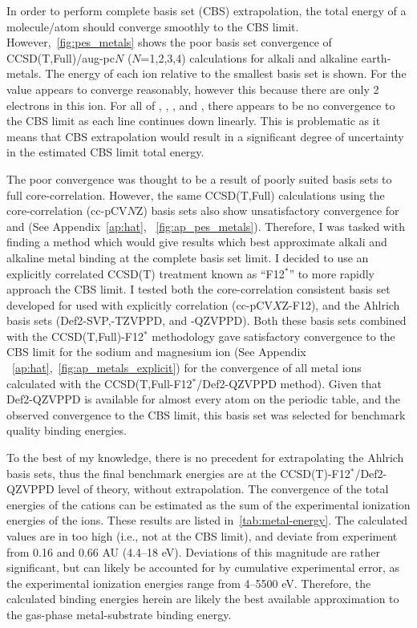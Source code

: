 In order to perform complete basis set (CBS) extrapolation, the total energy of a molecule/atom should converge smoothly to the CBS limit.\cite{Truhlar1998} However,~\ref{fig:pes_metals} shows the poor basis set convergence of CCSD(T,Full)/aug-pc$N$ ($N$=1,2,3,4) calculations for alkali and alkaline earth-metals. The energy of each ion relative to the smallest basis set is shown. For  the value appears to converge reasonably, however this because there are only 2 electrons in this ion. For all of , , , and , there appears to be no convergence to the CBS limit as each line continues down linearly. This is problematic as it means that CBS extrapolation would result in a significant degree of uncertainty in the estimated CBS limit total energy.

The poor convergence was thought to be a result of poorly suited basis sets to full core-correlation. However, the same CCSD(T,Full) calculations using the core-correlation (cc-pCV$N$Z) basis sets also show unsatisfactory convergence for  and  (See Appendix~\ref{ap:hat}, ~\ref{fig:ap_pes_metals}). Therefore, I was tasked with finding a method which would give results which best approximate alkali and alkaline metal binding at the complete basis set limit. I decided to use an explicitly correlated CCSD(T) treatment known as ``F12$^*$'' to more rapidly approach the CBS limit.\cite{Tenno2012} I tested both the core-correlation consistent basis set developed for used with explicitly correlation (cc-pCV$X$Z-F12),\cite{Peterson2008} and the Ahlrich basis sets (Def2-SVP,-TZVPPD, and -QZVPPD).\cite{Rappoport2010} Both these basis sets combined with the CCSD(T,Full)-F12$^*$ methodology gave satisfactory convergence to the CBS limit for the sodium and magnesium ion (See Appendix ~\ref{ap:hat},~\ref{fig:ap_metals_explicit}) for the convergence of all metal ions calculated with the CCSD(T,Full-F12$^*$/Def2-QZVPPD method). Given that Def2-QZVPPD is available for almost every atom on the periodic table, and the observed convergence to the CBS limit, this basis set was selected for benchmark quality binding energies.

To the best of my knowledge, there is no precedent for extrapolating the Ahlrich basis sets, thus the final benchmark energies are at the CCSD(T)-F12$^*$/Def2-QZVPPD level of theory, without extrapolation. The convergence of the total energies of the cations can be estimated as the sum of the experimental ionization energies of the ions. These results are listed in~\ref{tab:metal-energy}. The calculated values are in too high (i.e., not at the CBS limit), and deviate from experiment from 0.16 and 0.66 AU (4.4--18 eV). Deviations of this magnitude are rather significant, but can likely be accounted for by cumulative experimental error, as the experimental ionization energies range from 4--5500 eV. Therefore, the calculated binding energies herein are likely the best available approximation to the gas-phase metal-substrate binding energy.

